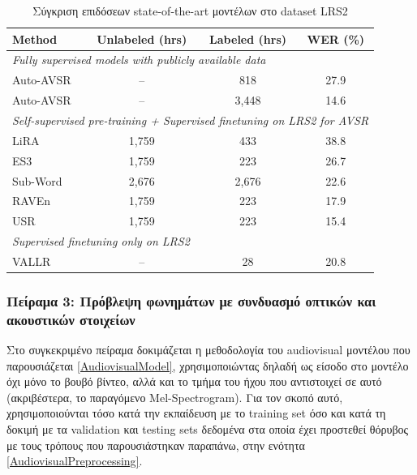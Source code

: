 \begin{table}[h]
\centering
\caption{Σύγκριση επιδόσεων state-of-the-art μοντέλων στο dataset LRS2}
\label{tab:sota_comparison_lrs2}
\begin{tabular}{l c c c}
\toprule
\textbf{Method} & \textbf{Unlabeled (hrs)} & \textbf{Labeled (hrs)} & \textbf{WER (\%)} \\
\midrule
\multicolumn{4}{l}{\textit{Fully supervised models with publicly available data}} \\
\midrule
Auto-AVSR \cite{Ma_2023}           & --      & 818     & 27.9 \\
Auto-AVSR \cite{Ma_2023}           & --      & 3{,}448 & 14.6 \\
\midrule
\multicolumn{4}{l}{\textit{Self-supervised pre-training + Supervised finetuning on LRS2 for AVSR}} \\
\midrule
LiRA \cite{ma2021liralearningvisualspeech}                      & 1{,}759   & 433   & 38.8 \\
ES3 \cite{Zhang_2024_CVPR}                        & 1{,}759   & 223   & 26.7 \\
Sub-Word \cite{prajwal2021subwordlevellipreading}               & 2{,}676   & 2{,}676 & 22.6 \\
RAVEn \cite{haliassos2023jointlylearningvisualauditory}                    & 1{,}759   & 223   & 17.9 \\
USR \cite{haliassos2024unifiedspeechrecognitionsingle}                        & 1{,}759   & 223   & 15.4 \\
\midrule
\multicolumn{4}{l}{\textit{Supervised finetuning only on LRS2}} \\
\midrule
VALLR  \cite{thomas2026vallrvisualasrlanguage}                        & --      & 28      & 20.8 \\
\bottomrule
\end{tabular}
\end{table}

\subsubsection{Πείραμα 3: Πρόβλεψη φωνημάτων με συνδυασμό οπτικών και ακουστικών στοιχείων}
\label{Experiment 3}

Στο συγκεκριμένο πείραμα δοκιμάζεται η μεθοδολογία του audiovisual μοντέλου που παρουσιάζεται \ref{AudiovisualModel}, χρησιμοποιώντας δηλαδή ως είσοδο στο μοντέλο όχι μόνο το βουβό βίντεο, αλλά και το τμήμα του ήχου που αντιστοιχεί σε αυτό (ακριβέστερα, το παραγόμενο Mel-Spectrogram). Για τον σκοπό αυτό, χρησιμοποιούνται τόσο κατά την εκπαίδευση με το training set όσο και κατά τη δοκιμή με τα validation και testing sets δεδομένα στα οποία έχει προστεθεί θόρυβος με τους τρόπους που παρουσιάστηκαν παραπάνω, στην ενότητα \ref{AudiovisualPreprocessing}.

